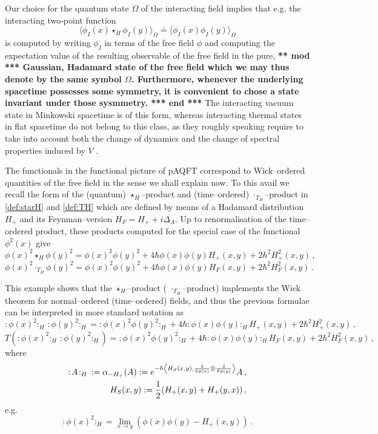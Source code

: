 \documentclass[10pt]{book}
\newcommand{\wick}[1]{:\!{#1}\!:}
\theoremstyle{break}
\begin{document}
Our choice for the quantum state $\Omega$ of the interacting field implies that e.g. the interacting two-point function 
$$\langle \phi_I(x)\star_H\phi_I(y)\rangle_\Omega\doteq \langle \phi_I(x)\phi_I(y)\rangle_\Omega$$
is computed by writing $\phi_I$ in terms of the free field $\phi$ and computing the expectation value of the resulting observable of the free field in the pure,  
{\bf *** mod *** Gaussian, Hadamard state of the free field which we may thus denote by the same symbol $\Omega$. Furthermore, whenever the underlying spacetime possesses some symmetry, it is convenient to chose a state invariant under those sysmmetry.    *** end ***}
The interacting vacuum state in Minkowski spacetime is of this form, whereas interacting thermal states in flat spacetime do not belong to this class, as they roughly speaking require to take into account both the change of dynamics and the change of spectral properties induced by $V$ \cite{Fredenhagen:2013cna}.

The functionals in the functional picture of pAQFT correspond to Wick--ordered quantities of the free field in the sense we shall explain now. To this avail we recall the form of the (quantum) $\star_H$--product and (time--ordered) $\cdot_{T_H}$--product in \eqref{def:starH} and \eqref{def:TH} which are defined by means of a Hadamard distribution $H_+$ and its Feynman--version $H_F = H_+ + i \Delta_A$. Up to renormalisation of the time--ordered product, these products computed for the special case of the functional $\phi^2(x)$ give
$$
\phi(x)^2\star_H \phi(y)^2=\phi(x)^2\phi(y)^2+4\hbar \phi(x)\phi(y) H_+(x,y)+2\hbar^2 H^2_+(x,y)\,,
$$
$$
\phi(x)^2\cdot_{T_H}\phi(y)^2=\phi(x)^2\phi(y)^2+4\hbar \phi(x)\phi(y) H_F(x,y)+2\hbar^2 H^2_F(x,y)\,.
$$

This example shows that the $\star_H$--product ( $\cdot_{T_H}$--product) implements the Wick theorem for normal--ordered (time--ordered) fields, and thus the previous formulae can be interpreted in more standard notation as 
$$\wick{\phi(x)^2}_H\,\wick{\phi(y)^2}_H=\wick{\phi(x)^2\phi(y)^2}_H+4\hbar \wick{\phi(x)\phi(y)}_H H_+(x,y)+2\hbar^2 H^2_+(x,y)\,,$$
$$T\left(\wick{\phi(x)^2}_H\,\wick{\phi(y)^2}_H\right)=\wick{\phi(x)^2\phi(y)^2}_H+4\hbar \wick{\phi(x)\phi(y)}_H H_F(x,y)+2\hbar^2 H^2_F(x,y)\,,$$
where
\begin{eqnarray}\label{eq_defalpha}
{\wick{A}}_H\,:=\alpha_{-H_+}(A):=e^{-\hbar\left\langle H_S(x,y),\frac{\delta}{\delta\phi(x)}\otimes \frac{\delta}{\delta\phi(y)}\right\rangle}A\,,\\
H_S(x,y) := \frac12 (H_+(x,y)+H_+(y,x))\,,\notag
\end{eqnarray}
e.g. $$\wick{\phi(x)^2}_H=\lim_{x\to y}\left(\phi(x)\phi(y)-H_+(x,y)\right)\,.$$
\end{document}
